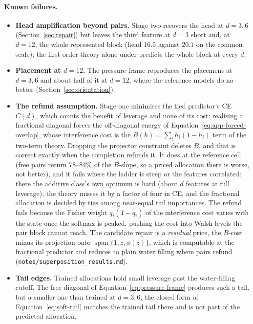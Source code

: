 \paragraph{Known failures.}
\begin{itemize}
\item \textbf{Head amplification beyond pairs.} Stage two recovers the head at
\(d=3,6\) (Section~\ref{sec:repair}) but leaves the third feature at \(d=3\) short and,
at \(d=12\), the whole represented block (head \(16.5\) against \(20.1\) on the common
scale); the first-order theory alone under-predicts the whole block at every \(d\).
\item \textbf{Placement at \(d=12\).} The pressure frame reproduces the placement at
\(d=3,6\) and about half of it at \(d=12\), where the reference models do no better
(Section~\ref{sec:orientation}).
\item \textbf{The refund assumption.} Stage one minimises the tied predictor's CE
\(C(d)\), which counts the benefit of leverage and none of its cost: realising a fractional
diagonal forces the off-diagonal energy of Equation~\eqref{eq:app-forced-overlap}, whose
interference cost is the \(B(h)=\sum_i h_i(1-h_i)\) term of the two-term theory. Dropping
the projector constraint deletes \(B\), and that is correct exactly when the completion
refunds it. It does at the reference cell (free pairs return 78--84\% of the \(B\)-slope,
so a priced allocation there is worse, not better), and it fails where the ladder is steep
or the features correlated: there the additive class's own optimum is hard (about \(d\)
features at full leverage), the theory misses it by a factor of four in CE, and the
fractional allocation is decided by ties among near-equal tail importances. The
refund fails because the Fisher weight \(q_i(1-q_i)\) of the interference cost varies with
the state once the softmax is peaked, pushing the cost into Walsh levels the pair block
cannot reach. The candidate repair is a \emph{residual} price, the \(B\)-cost minus its
projection onto \(\operatorname{span}\{1,z,\phi(z)\}\), which is computable at the
fractional predictor and reduces to plain water filling where pairs refund
(\texttt{notes/superposition\_results.md}).
\item \textbf{Tail edges.} Trained allocations hold small leverage past the
water-filling cutoff. The free diagonal of Equation~\eqref{eq:pressure-frame} produces
such a tail, but a smaller one than trained at \(d=3,6\); the closed form of
Equation~\eqref{eq:soft-tail} matches the trained tail there and is not part of the
predicted allocation.
\end{itemize}

